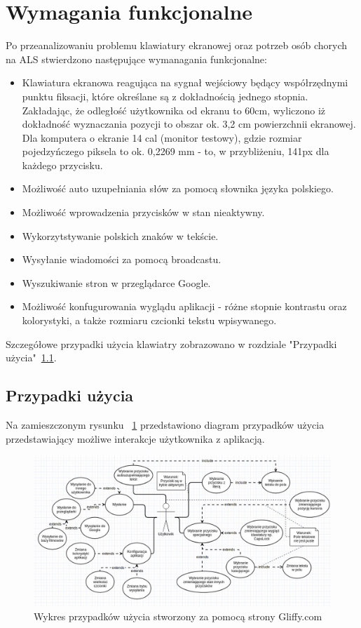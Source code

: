 \documentclass[twoside,a4paper]{book}
\begin{document}
 
\section{Wymagania funkcjonalne}
Po przeanalizowaniu problemu klawiatury ekranowej oraz potrzeb osób chorych na ALS stwierdzono następujące wymanagania funkcjonalne:
\begin{itemize}
\item Klawiatura ekranowa reagująca na sygnał wejściowy będący współrzędnymi punktu fiksacji, które określane są z dokładnością jednego stopnia. Zakładając, że odległość użytkownika od ekranu to 60cm, wyliczono iż dokładność wyznaczania pozycji to obszar ok. 3,2 cm powierzchnii ekranowej. Dla komputera o ekranie 14 cal (monitor testowy), gdzie rozmiar pojedzyńczego piksela to ok. 0,2269 mm - to, w przybliżeniu, 141px dla każdego przycisku. 
\item Możliwość auto uzupełniania słów za pomocą słownika języka polskiego.
\item Możliwość wprowadzenia przycisków w stan nieaktywny. 
\item Wykorzytstywanie polskich znaków w tekście. 
\item Wysyłanie wiadomości za pomocą broadcastu. 
\item Wyszukiwanie stron w przeglądarce Google.
\item Możliwość konfugurowania wyglądu aplikacji - różne stopnie kontrastu oraz kolorystyki, a także rozmiaru czcionki tekstu wpisywanego. 
\end{itemize}
Szczegółowe przypadki użycia klawiatry zobrazowano w rozdziale "Przypadki użycia"~\ref{sec:uml}.

\subsection{Przypadki użycia}
  \label{sec:uml}
  Na zamieszczonym rysunku ~\ref{fig:useCase} przedstawiono diagram przypadków użycia przedstawiający możliwe interakcje użytkownika z aplikacją. 
\begin{figure}[!h]
		\centering
		\includegraphics[scale=0.4]{img/useCase.jpg}
		\caption{Wykres przypadków użycia stworzony za pomocą strony Gliffy.com}
		\label{fig:useCase}
\end{figure}
\end{document}
